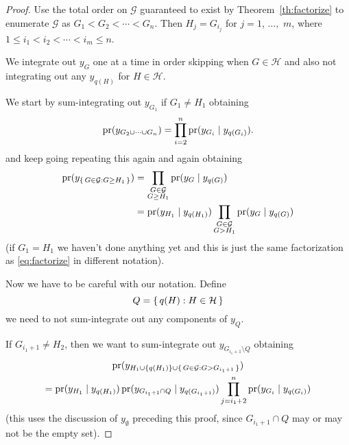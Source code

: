 \begin{proof}
Use the total order on $\mathcal{G}$ guaranteed
to exist by Theorem~\ref{th:factorize}
to enumerate $\mathcal{G}$ as $G_1 < G_2 < \cdots < G_n$.
Then $H_j = G_{i_j}$ for $j = 1$, $\ldots,$ $m$,
where $1 \le i_1 < i_2 < \cdots < i_m \le n$.

We integrate out $y_G$ one at a time
in order skipping when $G \in \mathcal{H}$ and also not integrating out
any $y_{q(H)}$ for $H \in \mathcal{H}$.

We start by sum-integrating out $y_{G_1}$ if $G_1 \neq H_1$ obtaining
$$
   \operatorname{pr}(y_{G_2 \cup \cdots \cup G_n})
   =
   \prod_{i = 2}^n \operatorname{pr}(y_{G_i} \mid y_{q(G_i)}).
$$
and keep going repeating this again and again obtaining
\begin{align*}
   \operatorname{pr}(y_{\{\, G \in \mathcal{G} : G \ge H_1 \,\}})
   & =
   \prod_{\substack{G \in \mathcal{G} \\ G \ge H_1}}
   \operatorname{pr}(y_G \mid y_{q(G)})
   \\
   & =
   \operatorname{pr}(y_{H_1} \mid y_{q(H_1)})
   \prod_{\substack{G \in \mathcal{G} \\ G > H_1}}
   \operatorname{pr}(y_G \mid y_{q(G)})
\end{align*}
(if $G_1 = H_1$ we haven't done anything yet and this is just the same
factorization as \eqref{eq:factorize} in different notation).

Now we have to be careful with our notation.  Define
$$
   Q = \{\,  q(H) : H \in \mathcal{H}  \,\}
$$
we need to not sum-integrate out any components of $y_Q$.

If $G_{i_1 + 1} \neq H_2$, then we want to sum-integrate out
$y_{G_{i_1 + 1} \setminus Q}$ obtaining
\begin{multline*}
   \operatorname{pr}(y_{H_1 \cup \{q(H_1)\} \cup \{\, G \in \mathcal{G} : G > G_{i_1 + 1} \,\}})
   \\
   =
   \operatorname{pr}(y_{H_1} \mid y_{q(H_1)})
   \operatorname{pr}(y_{G_{i_1 + 1} \cap Q} \mid y_{q(G_{i_1 + 1})})
   \prod_{j = i_1 + 2}^n
   \operatorname{pr}(y_{G_i} \mid y_{q(G_i)})
\end{multline*}
(this uses the discussion of $y_\emptyset$ preceding this proof,
since $G_{i_1 + 1} \cap Q$ may or may not be the empty set).


\end{proof}
